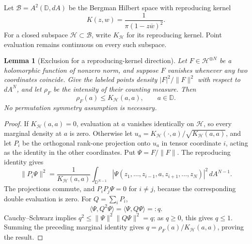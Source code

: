 \documentclass[11pt,a4paper]{article}
\numberwithin{equation}{section}
\newtheorem{lemma}[theorem]{Lemma}
\theoremstyle{definition}
\theoremstyle{remark}
\begin{document}
Let $\mathcal B=A^2(\mathbb D,dA)$ be the Bergman Hilbert space with
reproducing kernel
\[
 K(z,w)=\frac1{\pi(1-z\overline w)^2}.
\]
For a closed subspace $\mathcal H\subset\mathcal B$, write $K_{\mathcal H}$
for its reproducing kernel. Point evaluation remains continuous on every
such subspace.

\begin{lemma}[Exclusion for a reproducing-kernel direction]
\label{lem:bergman-reproducing-exclusion}
Let $F\in\mathcal H^{\otimes N}$ be a holomorphic function of nonzero
norm, and suppose $F$ vanishes whenever any two coordinates coincide.
Give the labeled points density $|F|^2/\|F\|^2$ with respect to $dA^N$,
and let $\rho_F$ be the intensity of their counting measure. Then
\begin{equation}
 \rho_F(a)\leq K_{\mathcal H}(a,a),\qquad a\in\mathbb D.
 \label{eq:bergman-reproducing-exclusion}
\end{equation}
No permutation symmetry assumption is necessary.
\end{lemma}

\begin{proof}
If $K_{\mathcal H}(a,a)=0$, evaluation at $a$ vanishes identically on
$\mathcal H$, so every marginal density at $a$ is zero. Otherwise let
$u_a=K_{\mathcal H}(\cdot,a)/\sqrt{K_{\mathcal H}(a,a)}$, and let $P_i$
be the orthogonal rank-one projection onto $u_a$ in tensor coordinate
$i$, acting as the identity in the other coordinates. Put $\Psi=F/\|F\|$.
The reproducing identity gives
\[
 \|P_i\Psi\|^2
 =\frac1{K_{\mathcal H}(a,a)}
   \int_{\mathbb D^{N-1}}|\Psi(z_1,\ldots,z_{i-1},a,
                                  z_{i+1},\ldots,z_N)|^2\,dA^{N-1}.
\]
The projections commute, and $P_iP_j\Psi=0$ for $i\ne j$, because
the corresponding double evaluation is zero. For $Q=\sum_iP_i$,
\[
 \langle\Psi,Q^2\Psi\rangle=\langle\Psi,Q\Psi\rangle=:q.
\]
Cauchy--Schwarz implies $q^2\leq\|\Psi\|^2\|Q\Psi\|^2=q$;
as $q\geq0$, this gives $q\leq1$. Summing the preceding marginal
identity gives $q=\rho_F(a)/K_{\mathcal H}(a,a)$, proving the result.
\end{proof}
\end{document}
